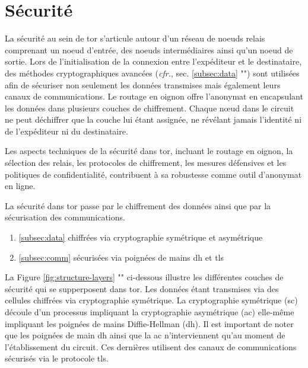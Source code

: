 \section{S\'ecurit\'e}\label{sec:security}

La sécurité au sein de \acrshort{tor} s'articule autour d'un réseau de noeuds relais comprenant un noeud d'entrée, des noeuds intermédiaires ainsi qu'un noeud de sortie.
Lors de l'initialisation de la connexion entre l'expéditeur et le destinataire, des méthodes cryptographiques avancées (\textit{cfr.}, sec. \ref{subsec:data} "") sont utilisées afin de sécuriser non seulement les données transmises mais également leurs canaux de communications.
Le routage en oignon offre l'anonymat en encapsulant les données dans plusieurs couches de chiffrement. 
Chaque nœud dans le circuit ne peut déchiffrer que la couche lui étant assignée, ne révélant jamais l'identité ni de l'expéditeur ni du destinataire.

Les aspects techniques de la sécurité dans \acrshort{tor}, incluant le routage en oignon, la sélection des relais, les protocoles de chiffrement, les mesures défensives et les politiques de confidentialité, contribuent à sa robustesse comme outil d'anonymat en ligne.

La sécurité dans \acrshort{tor} passe par le chiffrement des données ainsi que par la sécurisation des communications.
\begin{enumerate}
  \item \ref{subsec:data}  chiffrées via cryptographie symétrique et asymétrique
  \item \ref{subsec:comm}  sécurisées via poignées de mains \acrfull{dh} et \acrfull{tls}
\end{enumerate}

La Figure \ref{fig:structure-layers} "" ci-dessous illustre les différentes couches de sécurité qui se supperposent dans \acrshort{tor}.
Les données étant transmises via des cellules chiffrées via cryptographie symétrique. 
La cryptographie symétrique (\acrshort{sc}) découle d'un processus impliquant la cryptographie asymétrique (\acrshort{ac}) elle-même impliquant les poignées de mains Diffie-Hellman (\acrshort{dh}).
Il est important de noter que les poignées de main \acrshort{dh} ainsi que la \acrshort{ac} n'interviennent qu'au moment de l'établissement du circuit.
Ces dernières utilisent des canaux de communications sécurisés via le protocole \acrshort{tls}.



